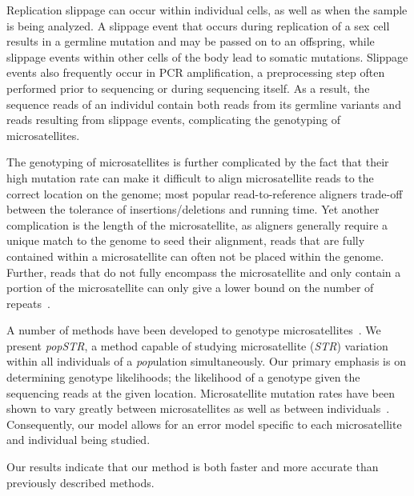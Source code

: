 \documentclass{bioinfo}
\begin{document}
Replication slippage can occur within individual cells, as well as when the sample is being analyzed.
A slippage event that occurs during replication of a sex cell results in a germline mutation and may be passed on to an offspring, while slippage events 
within other cells of the body lead to somatic mutations.  Slippage events also frequently occur in PCR amplification, a preprocessing step often performed
prior to sequencing or during sequencing itself.  As a result, the sequence reads of an individul contain both reads from its germline variants and 
reads resulting from slippage events, complicating the genotyping of microsatellites.

The genotyping of microsatellites is further complicated by the fact that their high mutation rate can make it difficult to align microsatellite reads to the correct
location on the genome; most popular read-to-reference aligners trade-off between the tolerance of insertions/deletions and running time.
Yet another complication is the length of the microsatellite, as aligners generally require a unique match to the genome to seed their alignment, reads that are fully 
contained within a microsatellite can often not be placed within the genome.  Further, reads that do not fully encompass the microsatellite and only contain a portion 
of the microsatellite can only give a lower bound on the number of repeats~\cite{Gymrek2012}. 

A number of methods have been developed to genotype microsatellites~\cite{VNTRseek,RepeatSeq,lobSTR}.   We present {\em popSTR}, a method capable of studying 
microsatellite ({\em STR}) variation within all individuals of a {\em pop}ulation simultaneously.  
Our primary emphasis is on determining genotype likelihoods; the likelihood of a genotype given the sequencing reads at the given location.  
Microsatellite mutation rates have been shown to vary greatly between microsatellites as well as between individuals~\cite{sun2012direct}. Consequently, our model allows 
for an error model specific to each microsatellite and individual being studied.

Our results indicate that our method is both faster and more accurate than previously described methods.


\end{document}
